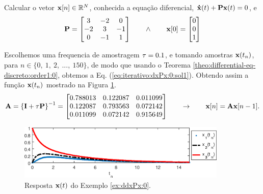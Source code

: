 \begin{example}
\label{ex:iterativo:dxPx:0}
Calcular o vetor $\VECTOR{x}[n] \in \mathbb{R}^{N}$,
conhecida a equação diferencial, $\DTVECTOR{x}(t) + \MATRIX{P} \VECTOR{x}(t)=0$, e
\begin{equation}
\MATRIX{P}=
\begin{bmatrix}
3 & -2 & 0\\
-2 & 3 & -1\\
0 & -1 & 1
\end{bmatrix}
\qquad \wedge \qquad
\VECTOR{x}[0]=
\begin{bmatrix}
0\\
0\\
1
\end{bmatrix}
\end{equation}
\end{example}


\begin{SolutionT}
\label{ex:iterativo:dxPx:0:sol1}
Escolhemos uma frequencia de amostragem $\tau=0.1$, e
tomando amostras $\VECTOR{x}(t_n)$, para $n \in \{0,~ 1,~ 2,~ ...,~ 150\}$, 
de modo que usando o Teorema \ref{theo:differential-eq-discreto:order1:0}, obtemos a Eq. (\ref{eq:iterativo:dxPx:0:sol1}).
Obtendo assim a função $\VECTOR{x}(t_n)$ mostrado na Figura \ref{fig:ex:iterativo:dxPx:0}.
\begin{equation}\label{eq:iterativo:dxPx:0:sol1}
\MATRIX{A}=
\left\{\MATRIX{I} + \ToS \MATRIX{P}\right\}^{-1}=
\begin{bmatrix}
   0.788013 & 0.122087 & 0.011099 \\
   0.122087 & 0.793563 & 0.072142 \\
   0.011099 & 0.072142 & 0.915649 
\end{bmatrix}
\qquad \rightarrow \qquad
\VECTOR{x}[n]=\MATRIX{A} \VECTOR{x}[n-1].
\end{equation}

\end{SolutionT}
     \begin{figure}[!h]
         \centering
         \includegraphics[width=0.89\textwidth]{chapters/differential-eq-discreto/mfiles/primeiroorder/primeirooder1.eps}
         \caption{Resposta $\VECTOR{x}(t)$ do Exemplo \ref{ex:ddxPx:0}.}
         \label{fig:ex:iterativo:dxPx:0}
     \end{figure}
